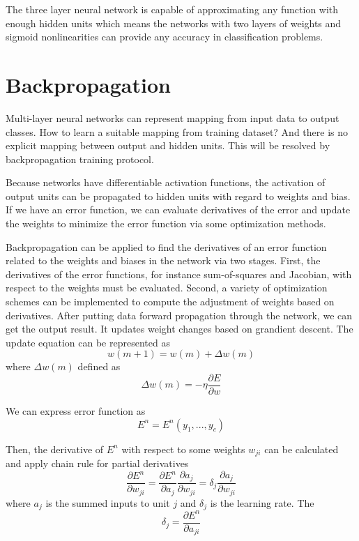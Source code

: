The three layer neural network is capable of approximating any function with enough hidden units which means the networks with two layers of weights and sigmoid nonlinearities can provide any accuracy in classification problems. 


\section{Backpropagation}
Multi-layer neural networks can represent mapping from input data to output classes. How to learn a suitable mapping from training dataset? And there is no explicit mapping between output and hidden units. This will be resolved by backpropagation training protocol.

Because networks have differentiable activation functions, the activation of output units can be propagated to hidden units with regard to weights and bias. If we have an error function, we can evaluate derivatives of the error and update the weights to minimize the error function via some optimization methods.

Backpropagation can be applied to find the derivatives of an error function related to the weights and biases in the network via two stages. First, the derivatives of the error functions, for instance sum-of-squares and Jacobian, with respect to the weights must be evaluated. Second, a variety of optimization schemes can be implemented to compute the adjustment of weights based on derivatives. After putting data forward propagation through the network, we can get the output result. It updates weight changes based on grandient descent. The update equation can be represented as
\begin{equation}\label{eq:UpdateWeights}
w(m+1) = w(m) + \Delta w(m)
\end{equation}
where $\Delta w(m)$ defined as 
\begin{equation}\label{eq:DeltaWeights}
\Delta w(m) = -\eta \frac{\partial E}{\partial w}
\end{equation}


We can express error function as
\begin{equation}\label{eq:errorfunc}
E^{n} = E^{n}(y_{1},...,y_{c})
\end{equation}

Then, the derivative of $E^{n}$ with respect to some weights $w_{ji}$ can be calculated and apply chain rule for partial derivatives
\begin{equation}\label{eq:chainrule}
\frac{\partial E^{n}}{\partial w_{ji}} = \frac{\partial E^{n}}{\partial a_{j}} \frac{\partial a_{j}}{\partial w_{ji}} = \delta_{j} \frac{\partial a_{j}}{\partial w_{ji}}
\end{equation}
where $a_{j}$ is the summed inputs to unit $j$ and $\delta_{j}$ is the learning rate. The 
\begin{equation}\label{eq:sensitive}
\delta_{j} = \frac{\partial E^{n}}{\partial a_{ji}}
\end{equation}






